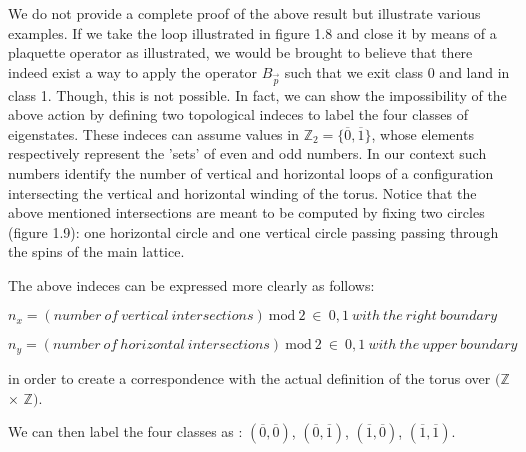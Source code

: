 \documentclass{Configuration_Files/PoliMi3i_thesis}
\begin{document}
We do not provide a complete proof of the above result but illustrate various examples.
If we take the loop illustrated in figure 1.8 and close it by means of a plaquette operator as illustrated, we would be brought to believe that there indeed exist a way to apply the operator $B_{\vec{p}} $ such that we exit class 0 and land in class 1. Though, this is not possible. \newline
In fact, we can show the impossibility of the above action by defining two topological indeces to label the four classes of eigenstates. These indeces can assume values in $\mathbb{Z}_2=\{\overline{0},\overline{1} \}$, whose elements respectively represent the 'sets' of even and odd numbers. In our context such numbers identify the number of vertical and horizontal loops of a configuration intersecting the vertical and horizontal winding of the torus. Notice that the above mentioned intersections are meant to be computed by fixing two circles (figure 1.9): one horizontal circle and one vertical circle passing passing through the spins of the main lattice.

The above indeces can be expressed more clearly as follows: 

\begin{center}
	$n_x= (number \ of \ vertical \ intersections) \ \mathrm{mod} \ 2 \ \in \ {0,1} \ with \ the \ right \ boundary$
\end{center}
\begin{center}
	$n_y= (number \ of \ horizontal \ intersections) \ \mathrm{mod} \ 2 \ \in \ {0,1} \ with \ the \ upper \ boundary$
\end{center}


in order to create a correspondence with the actual definition of the torus over $(\mathbb{Z}$ $\times$ $\mathbb{Z})$. 

We can then label the four classes as : $(\overline{0},\overline{0} )$, $(\overline{0},\overline{1} )$, $(\overline{1},\overline{0})$, $(\overline{1},\overline{1})$.\newline

\end{document}
